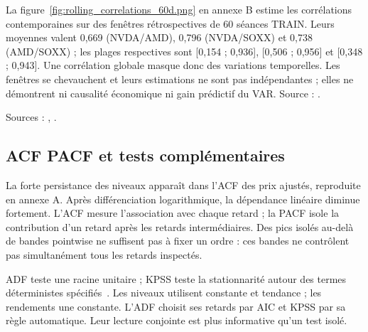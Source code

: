 La figure~\ref{fig:rolling_correlations_60d.png} en annexe B estime les corrélations contemporaines sur des fenêtres rétrospectives de 60 séances TRAIN. Leurs moyennes valent 0,669 (NVDA/AMD), 0,796 (NVDA/SOXX) et 0,738 (AMD/SOXX) ; les plages respectives sont [0,154 ; 0,936], [0,506 ; 0,956] et [0,348 ; 0,943]. Une corrélation globale masque donc des variations temporelles. Les fenêtres se chevauchent et leurs estimations ne sont pas indépendantes ; elles ne démontrent ni causalité économique ni gain prédictif du VAR. Source : .



Sources : , .





\subsection{ACF PACF et tests complémentaires}



La forte persistance des niveaux apparaît dans l’ACF des prix ajustés, reproduite en annexe A. Après différenciation logarithmique, la dépendance linéaire diminue fortement. L’ACF mesure l’association avec chaque retard ; la PACF isole la contribution d’un retard après les retards intermédiaires. Des pics isolés au-delà de bandes pointwise ne suffisent pas à fixer un ordre : ces bandes ne contrôlent pas simultanément tous les retards inspectés.






ADF teste une racine unitaire ; KPSS teste la stationnarité autour des termes déterministes spécifiés~\cite{R4,R5}. Les niveaux utilisent constante et tendance ; les rendements une constante. L’ADF choisit ses retards par AIC et KPSS par sa règle automatique. Leur lecture conjointe est plus informative qu’un test isolé.



